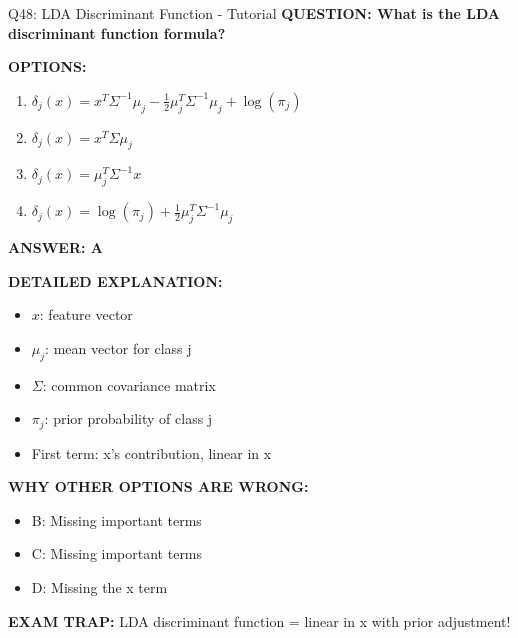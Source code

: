 \documentclass[8pt]{beamer}
\begin{document}
	\begin{frame}{Q48: LDA Discriminant Function - Tutorial}
		\fontsize{6.5}{7.5}\selectfont
		\textbf{QUESTION: What is the LDA discriminant function formula?}
		
		\vspace{0.1cm}
		\textbf{OPTIONS:}
		\begin{enumerate}
			\item $\delta_j(x) = x^T \Sigma^{-1} \mu_j - \frac{1}{2}\mu_j^T \Sigma^{-1} \mu_j + \log(\pi_j)$
			\item $\delta_j(x) = x^T \Sigma \mu_j$
			\item $\delta_j(x) = \mu_j^T \Sigma^{-1} x$
			\item $\delta_j(x) = \log(\pi_j) + \frac{1}{2}\mu_j^T \Sigma^{-1} \mu_j$
		\end{enumerate}
		
		\vspace{0.1cm}
		\textcolor{myblue}{\textbf{ANSWER: A}}
		
		\vspace{0.1cm}
		\textbf{DETAILED EXPLANATION:}
		\begin{itemize}
			\item $x$: feature vector
			\item $\mu_j$: mean vector for class j
			\item $\Sigma$: common covariance matrix
			\item $\pi_j$: prior probability of class j
			\item First term: x's contribution, linear in x
		\end{itemize}
		
		\vspace{0.1cm}
		\textcolor{myred}{\textbf{WHY OTHER OPTIONS ARE WRONG:}}
		\begin{itemize}
			\item \textcolor{myred}{B:} Missing important terms
			\item \textcolor{myred}{C:} Missing important terms
			\item \textcolor{myred}{D:} Missing the x term
		\end{itemize}
		
		\textcolor{myred}{\textbf{EXAM TRAP:}} LDA discriminant function = \textcolor{myblue}{linear in x with prior adjustment}!
	\end{frame}
	
\end{document}
